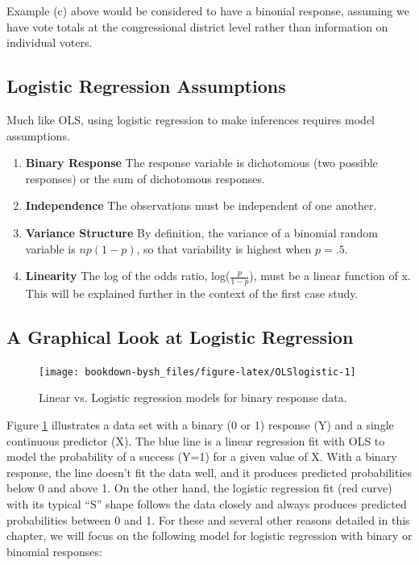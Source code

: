 \documentclass[
]{krantz}
\providecommand{\tightlist}{%
  \setlength{\itemsep}{0pt}\setlength{\parskip}{0pt}}
\begin{document}
Example (c) above would be considered to have a binonial response, assuming we have vote totals at the congressional district level rather than information on individual voters.

\hypertarget{logistic-regression-assumptions}{%
\subsection{Logistic Regression Assumptions}\label{logistic-regression-assumptions}}

Much like OLS, using logistic regression to make inferences requires model assumptions.

\begin{enumerate}
\def\labelenumi{\arabic{enumi}.}
\tightlist
\item
  \textbf{Binary Response} The response variable is dichotomous (two possible responses) or the sum of dichotomous responses.
\item
  \textbf{Independence} The observations must be independent of one another.
\item
  \textbf{Variance Structure} By definition, the variance of a binomial random variable is \(np(1-p)\), so that variability is highest when \(p=.5\).
\item
  \textbf{Linearity} The log of the odds ratio, log(\(\frac{p}{1-p}\)), must be a linear function of x. This will be explained further in the context of the first case study.
\end{enumerate}

\hypertarget{a-graphical-look-at-logistic-regression}{%
\subsection{A Graphical Look at Logistic Regression}\label{a-graphical-look-at-logistic-regression}}

\begin{figure}

{\centering \texttt{[image: bookdown-bysh\_files/figure-latex/OLSlogistic-1]} 

}

\caption{Linear vs. Logistic regression models for binary response data.}\label{fig:OLSlogistic}
\end{figure}

Figure \ref{fig:OLSlogistic} illustrates a data set with a binary (0 or 1) response (Y) and a single continuous predictor (X). The blue line is a linear regression fit with OLS to model the probability of a success (Y=1) for a given value of X. With a binary response, the line doesn't fit the data well, and it produces predicted probabilities below 0 and above 1. On the other hand, the logistic regression fit (red curve) with its typical ``S'' shape follows the data closely and always produces predicted probabilities between 0 and 1. For these and several other reasons detailed in this chapter, we will focus on the following model for logistic regression with binary or binomial responses:
\end{document}
